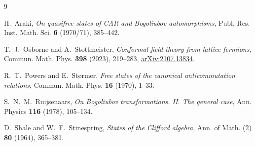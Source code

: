 \documentclass[11pt]{article}
\theoremstyle{remark}
\begin{document}
\begin{thebibliography}{9}

H.~Araki,
\emph{On quasifree states of CAR and Bogoliubov automorphisms},
Publ. Res. Inst. Math. Sci. \textbf{6} (1970/71), 385--442.

T.~J.~Osborne and A.~Stottmeister,
\emph{Conformal field theory from lattice fermions},
Commun. Math. Phys. \textbf{398} (2023), 219--283,
\href{https://arxiv.org/abs/2107.13834}{arXiv:2107.13834}.

R.~T.~Powers and E.~St{\o}rmer,
\emph{Free states of the canonical anticommutation relations},
Commun. Math. Phys. \textbf{16} (1970), 1--33.

S.~N.~M.~Ruijsenaars,
\emph{On Bogoliubov transformations. II. The general case},
Ann. Physics \textbf{116} (1978), 105--134.

D.~Shale and W.~F.~Stinespring,
\emph{States of the Clifford algebra},
Ann. of Math. (2) \textbf{80} (1964), 365--381.

\end{thebibliography}
\end{document}
